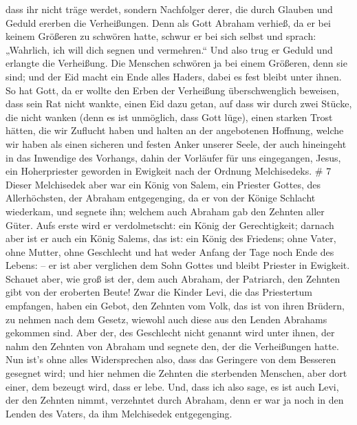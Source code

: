  dass ihr nicht träge werdet, sondern Nachfolger derer, die
durch Glauben und Geduld ererben die Verheißungen.  Denn
als Gott Abraham verhieß, da er bei keinem Größeren zu schwören hatte,
schwur er bei sich selbst  und sprach: „Wahrlich, ich will
dich segnen und vermehren.``  Und also trug er Geduld und
erlangte die Verheißung.  Die Menschen schwören ja bei
einem Größeren, denn sie sind; und der Eid macht ein Ende alles Haders,
dabei es fest bleibt unter ihnen.  So hat Gott, da er
wollte den Erben der Verheißung überschwenglich beweisen, dass sein Rat
nicht wankte, einen Eid dazu getan,  auf dass wir durch
zwei Stücke, die nicht wanken (denn es ist unmöglich, dass Gott lüge),
einen starken Trost hätten, die wir Zuflucht haben und halten an der
angebotenen Hoffnung,  welche wir haben als einen sicheren
und festen Anker unserer Seele, der auch hineingeht in das Inwendige des
Vorhangs,  dahin der Vorläufer für uns eingegangen, Jesus,
ein Hoherpriester geworden in Ewigkeit nach der Ordnung Melchisedeks. \#
7  Dieser Melchisedek aber war ein König von Salem, ein
Priester Gottes, des Allerhöchsten, der Abraham entgegenging, da er von
der Könige Schlacht wiederkam, und segnete ihn;  welchem
auch Abraham gab den Zehnten aller Güter. Aufs erste wird er
verdolmetscht: ein König der Gerechtigkeit; darnach aber ist er auch ein
König Salems, das ist: ein König des Friedens;  ohne Vater,
ohne Mutter, ohne Geschlecht und hat weder Anfang der Tage noch Ende des
Lebens: -- er ist aber verglichen dem Sohn Gottes und bleibt Priester in
Ewigkeit.  Schauet aber, wie groß ist der, dem auch Abraham,
der Patriarch, den Zehnten gibt von der eroberten Beute! 
Zwar die Kinder Levi, die das Priestertum empfangen, haben ein Gebot,
den Zehnten vom Volk, das ist von ihren Brüdern, zu nehmen nach dem
Gesetz, wiewohl auch diese aus den Lenden Abrahams gekommen sind.
 Aber der, des Geschlecht nicht genannt wird unter ihnen,
der nahm den Zehnten von Abraham und segnete den, der die Verheißungen
hatte.  Nun ist's ohne alles Widersprechen also, dass das
Geringere von dem Besseren gesegnet wird;  und hier nehmen
die Zehnten die sterbenden Menschen, aber dort einer, dem bezeugt wird,
dass er lebe.  Und, dass ich also sage, es ist auch Levi,
der den Zehnten nimmt, verzehntet durch Abraham,  denn er
war ja noch in den Lenden des Vaters, da ihm Melchisedek entgegenging.
